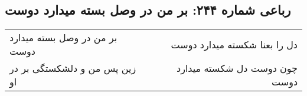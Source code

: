 \begin{center}
\section*{رباعی شماره ۲۴۴: بر من در وصل بسته میدارد دوست}
\label{sec:0244}
\begin{longtable}{l p{0.5cm} r}
بر من در وصل بسته میدارد دوست
&&
دل را بعنا شکسته میدارد دوست
\\
زین پس من و دلشکستگی بر در او
&&
چون دوست دل شکسته میدارد دوست
\\
\end{longtable}
\end{center}
